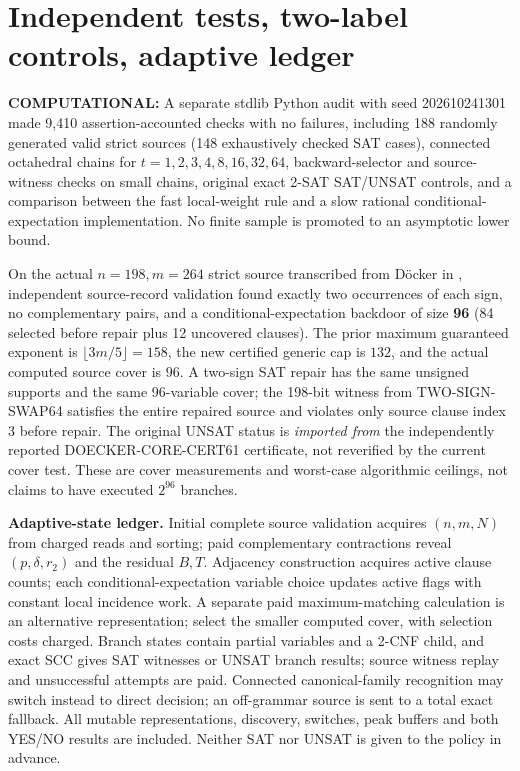 \documentclass[11pt]{article}
\begin{document}
\section{Independent tests, two-label controls, adaptive ledger}
\textbf{COMPUTATIONAL:} A separate stdlib Python audit with seed 202610241301 made 9,410 assertion-accounted checks with no failures, including 188 randomly generated valid strict sources (148 exhaustively checked SAT cases), connected octahedral chains for $t=1,2,3,4,8,16,32,64$, backward-selector and source-witness checks on small chains, original exact 2-SAT SAT/UNSAT controls, and a comparison between the fast local-weight rule and a slow rational conditional-expectation implementation. No finite sample is promoted to an asymptotic lower bound.
\par\noindent
On the actual $n=198,m=264$ strict source transcribed from D\"ocker in
,
independent source-record validation found exactly two occurrences of each sign, no complementary pairs, and a conditional-expectation backdoor of size \textbf{96} (84 selected before repair plus 12 uncovered clauses). The prior maximum guaranteed exponent is $\lfloor3m/5\rfloor=158$, the new certified generic cap is $132$, and the actual computed source cover is $96$. A two-sign SAT repair has the same unsigned supports and the same 96-variable cover; the 198-bit witness from TWO-SIGN-SWAP64 satisfies the entire repaired source and violates only source clause index 3 before repair. The original UNSAT status is \emph{imported from} the independently reported DOECKER-CORE-CERT61 certificate, not reverified by the current cover test. These are cover measurements and worst-case algorithmic ceilings, not claims to have executed $2^{96}$ branches.
\par\noindent\textbf{Adaptive-state ledger.} Initial complete source validation acquires $(n,m,N)$ from charged reads and sorting; paid complementary contractions reveal $(p,\delta,r_2)$ and the residual $B,T$. Adjacency construction acquires active clause counts; each conditional-expectation variable choice updates active flags with constant local incidence work. A separate paid maximum-matching calculation is an alternative representation; select the smaller computed cover, with selection costs charged. Branch states contain partial variables and a 2-CNF child, and exact SCC gives SAT witnesses or UNSAT branch results; source witness replay and unsuccessful attempts are paid. Connected canonical-family recognition may switch instead to direct decision; an off-grammar source is sent to a total exact fallback. All mutable representations, discovery, switches, peak buffers and both YES/NO results are included. Neither SAT nor UNSAT is given to the policy in advance.
\end{document}
